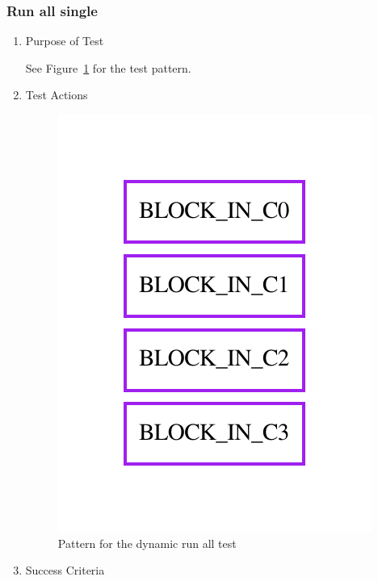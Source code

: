\documentclass[12pt,a4paper]{report}
\begin{document}
\subsubsection{Run all single}
\begin{enumerate}
	\item Purpose of Test

	See Figure~\ref{fig:Pattern_for_the_dynamic_run_all_test} for the test pattern.
	\item Test Actions
    \begin{figure}
        \centering 
        \includegraphics{TestPattern/dynamic_basic_run_all_single.pdf}
        \caption{Pattern for the dynamic run all test}
        \label{fig:Pattern_for_the_dynamic_run_all_test}
    \end{figure}
	\item Success Criteria
\end{enumerate}
\end{document}
